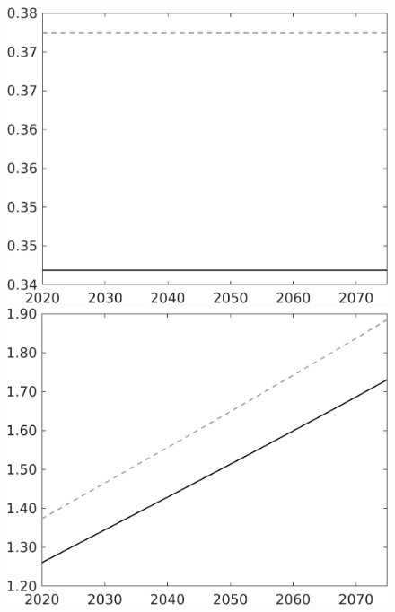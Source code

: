 \documentclass[12pt]{article}
\begin{document}
\begin{figure}[h!!]
\begin{minipage}[]{0.32\textwidth}
	\end{minipage}	
	\begin{minipage}[]{0.32\textwidth}
		\includegraphics[width=1\textwidth]{../../codding_model/own_basedOnFried/optimalPol_010922_revision/figures/all_13Sept22/CompTaul_LFBAU_Reg0_hh_spillover0_nsk1_xgr1_knspil1_sep1_countec0_GovRev0_etaa0.79_lgd0.png}
	\end{minipage}	
	\begin{minipage}[]{0.32\textwidth}
		\includegraphics[width=1\textwidth]{../../codding_model/own_basedOnFried/optimalPol_010922_revision/figures/all_13Sept22/CompTaul_LFBAU_Reg0_C_spillover0_nsk1_xgr1_knspil1_sep1_countec0_GovRev0_etaa0.79_lgd0.png}

\end{minipage}
\end{figure}
\end{document}
